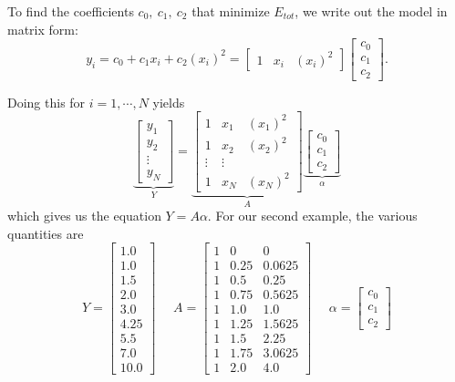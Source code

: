 \documentclass[11pt,twoside]{nsf_jwg} %
\newcommand{\Regressor}{A}
\newcommand{\Param}{\alpha}
\begin{document}
To find the coefficients $c_0, ~c_1,~ c_2$ that minimize $E_{tot}$, we write out the model in matrix form:
$$y_i=c_0 + c_1 x_i + c_2 (x_i)^2= \left[ \begin{array}{ccc} 1 & x_i & (x_i)^2 \end{array} \right] \left[ \begin{array}{c} c_0 \\ c_1 \\ c_2 \end{array} \right] .$$

Doing this for $i=1,\cdots,N$ yields
$$
\underbrace{\left[ \begin{array}{c} y_1 \\ y_2 \\ \vdots \\ y_N \end{array} \right]}_{Y} =
 \underbrace{\left[ \begin{array}{ccc} 1 & x_1 & (x_1)^2 \\ 1 & x_2 & (x_2)^2 \\ \vdots & \vdots \\ 1 & x_N & (x_N)^2 \end{array} \right]}_{\Regressor}
 \underbrace{\left[ \begin{array}{c} c_0 \\ c_1 \\ c_2 \end{array} \right] }_{\Param}
$$
which gives us the equation $Y = \Regressor \Param$. For our second example, the various quantities are
$$
Y = \left[ \begin{array}{l} 1.0  \\   1.0   \\  1.5  \\  2.0  \\  3.0 \\ 4.25 \\ 5.5 \\ 7.0 \\ 10.0 \end{array} \right] ~~~~~~
\Regressor= \left[ \begin{array}{cll} 1 & 0 & 0 \\ 1 & 0.25 & 0.0625
 \\ 1 & 0.5 & 0.25  \\ 1 & 0.75 & 0.5625\\ 1 & 1.0 & 1.0 \\ 1 & 1.25 &  1.5625 \\ 1 & 1.5 & 2.25\\ 1 & 1.75 & 3.0625 \\ 1 & 2.0 & 4.0 \end{array} \right] ~~~~~~
\Param = \left[ \begin{array}{c} c_0 \\ c_1 \\ c_2 \end{array} \right] $$
\end{document}
